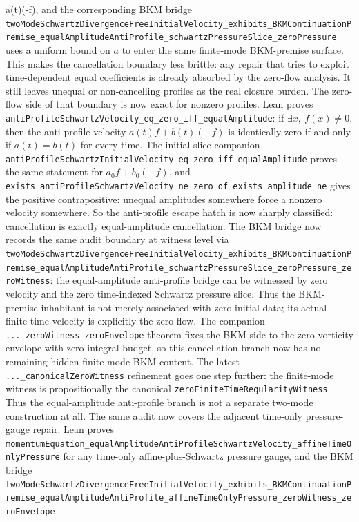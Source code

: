\documentclass[11pt]{article}
\theoremstyle{remark}
\begin{document}
a(t)(-f)\), and the corresponding BKM bridge
\texttt{twoModeSchwartzDivergenceFreeInitialVelocity\_exhibits\_BKMContinuationPremise\_equalAmplitudeAntiProfile\_schwartzPressureSlice\_zeroPressure}
uses a uniform bound on \(a\) to enter the same finite-mode BKM-premise
surface.  This makes the cancellation boundary less brittle: any repair that
tries to exploit time-dependent equal coefficients is already absorbed by the
zero-flow analysis.  It still leaves unequal or non-cancelling profiles as the
real closure burden.
The zero-flow side of that boundary is now exact for nonzero profiles.  Lean
proves
\texttt{antiProfileSchwartzVelocity\_eq\_zero\_iff\_equalAmplitude}: if
\(\exists x,\ f(x)\ne 0\), then the anti-profile velocity
\(a(t)f+b(t)(-f)\) is identically zero if and only if \(a(t)=b(t)\) for every
time.  The initial-slice companion
\texttt{antiProfileSchwartzInitialVelocity\_eq\_zero\_iff\_equalAmplitude}
proves the same statement for \(a_0f+b_0(-f)\), and
\texttt{exists\_antiProfileSchwartzVelocity\_ne\_zero\_of\_exists\_amplitude\_ne}
gives the positive contrapositive: unequal amplitudes somewhere force a
nonzero velocity somewhere.  So the anti-profile escape hatch is now sharply
classified: cancellation is exactly equal-amplitude cancellation.
The BKM bridge now records the same audit boundary at witness level via
\texttt{twoModeSchwartzDivergenceFreeInitialVelocity\_exhibits\_BKMContinuationPremise\_equalAmplitudeAntiProfile\_schwartzPressureSlice\_zeroPressure\_zeroWitness}:
the equal-amplitude anti-profile bridge can be witnessed by zero velocity and
the zero time-indexed Schwartz pressure slice.  Thus the BKM-premise inhabitant
is not merely associated with zero initial data; its actual finite-time
velocity is explicitly the zero flow.  The companion
\texttt{...\_zeroWitness\_zeroEnvelope} theorem fixes the BKM side to the zero
vorticity envelope with zero integral budget, so this cancellation branch now
has no remaining hidden finite-mode BKM content.  The latest
\texttt{...\_canonicalZeroWitness} refinement goes one step further: the
finite-mode witness is propositionally the canonical
\texttt{zeroFiniteTimeRegularityWitness}.  Thus the equal-amplitude
anti-profile branch is not a separate two-mode construction at all.
The same audit now covers the adjacent time-only pressure-gauge repair.  Lean
proves
\texttt{momentumEquation\_equalAmplitudeAntiProfileSchwartzVelocity\_affineTimeOnlyPressure}
for any time-only affine-plus-Schwartz pressure gauge, and the BKM bridge
\texttt{twoModeSchwartzDivergenceFreeInitialVelocity\_exhibits\_BKMContinuationPremise\_equalAmplitudeAntiProfile\_affineTimeOnlyPressure\_zeroWitness\_zeroEnvelope}
\end{document}
